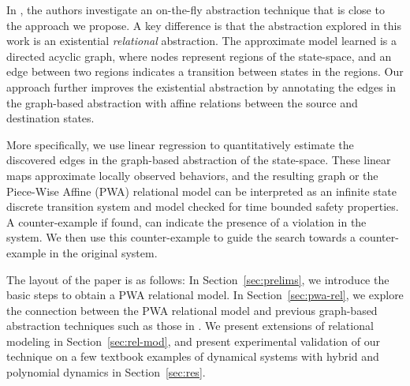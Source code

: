 In \cite{zutshi2014multiple}, the authors investigate an on-the-fly
abstraction technique that is close to the approach we propose. A key
difference is that the abstraction explored in this work is an
existential {\em relational} abstraction. The approximate model
learned is a directed acyclic graph, where nodes represent regions of
the state-space, and an edge between two regions indicates a
transition between states in the regions. Our approach further
improves the existential abstraction by annotating the edges in the
graph-based abstraction with affine relations between the source and
destination states.



More specifically, we use linear regression to quantitatively estimate
the discovered edges in the graph-based abstraction of the
state-space. These linear maps approximate locally observed behaviors,
and the resulting graph or the Piece-Wise Affine (PWA) relational
model can be interpreted as an infinite state discrete transition
system and model checked for time bounded safety properties. A
counter-example if found, can indicate the presence of a violation in
the system.  We then use this counter-example to guide the search
towards a counter-example in the original system.




The layout of the paper is as follows: In Section~\ref{sec:prelims},
we introduce the basic steps to obtain a PWA relational model. In
Section~\ref{sec:pwa-rel}, we explore the connection between the PWA
relational model and previous graph-based abstraction techniques such
as those in \cite{zutshi2014multiple}. We present extensions of
relational modeling in Section~\ref{sec:rel-mod}, and present
experimental validation of our technique on a few textbook examples of
dynamical systems with hybrid and polynomial dynamics in
Section~\ref{sec:res}.
